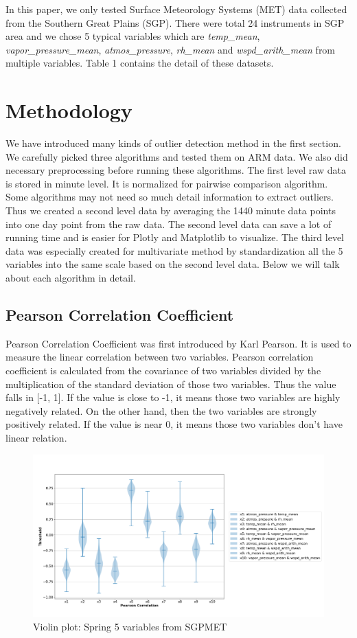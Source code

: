 \documentclass[letterpaper, 10 pt, conference]{ieeeconf}  %
\begin{document}
In this paper, we only tested Surface Meteorology Systems (MET) data collected from the Southern Great Plains (SGP). There were total 24 instruments in SGP area and we chose 5 typical variables which are \textit{temp\_mean}, \textit{vapor\_pressure\_mean}, \textit{atmos\_pressure}, \textit{rh\_mean} and \textit{wspd\_arith\_mean} from multiple variables. Table 1 contains the detail of these datasets. 

\section{Methodology}
We have introduced many kinds of outlier detection method in the first section. We carefully picked three algorithms and tested them on ARM data. We also did necessary preprocessing before running these algorithms. The first level raw data is stored in minute level. It is normalized for pairwise comparison algorithm. Some algorithms may not need so much detail information to extract outliers. Thus we created a second level data by averaging the 1440 minute data points into one day point from the raw data. The second level data can save a lot of running time and is easier for Plotly \cite{plotly} and Matplotlib \cite{Hunter:2007} to visualize. The third level data was especially created for multivariate method by standardization all the 5 variables into the same scale based on the second level data. Below we will talk about each algorithm in detail. 

\subsection{Pearson Correlation Coefficient} 
Pearson Correlation Coefficient was first introduced by Karl Pearson\cite{pearson1895note}. It is used to measure the linear correlation between two variables. Pearson correlation coefficient is calculated from the covariance of two variables divided by the multiplication of the standard deviation of those two variables. Thus the value falls in [-1, 1]. If the value is close to -1, it means those two variables are highly negatively related. On the other hand, then the two variables are strongly positively related. If the value is near 0, it means those two variables don't have linear relation. 

\begin{figure}[ht]
    \centering
    \includegraphics[width=\textwidth]{Spring.png}
    \caption{Violin plot: Spring 5 variables from SGPMET}
    \label{fig:pc}
\end{figure}
\end{document}
